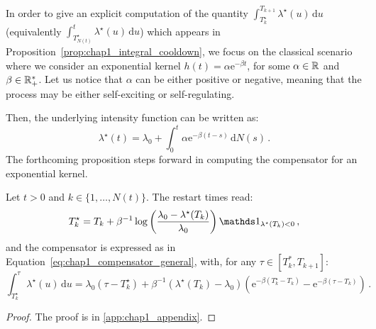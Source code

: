 In order to give an explicit computation of the quantity $\int_{T_{k}^\star}^{T_{k+1}}{\lambda^\star(u)\,\mathrm{d}u}$ (equivalently $\int_{T_{N(t)}^\star}^{t}{\lambda^\star(u)\,\mathrm{d}u}$) which appears in Proposition~\ref{prop:chap1_integral_cooldown}, we focus on the classical scenario where we consider an exponential kernel $h(t) = \alpha \mathrm{e}^{-\beta t}$, for some $\alpha\in{\mathbb R}$ and $\beta\in{\mathbb R}_+^*$.
Let us notice that $\alpha$ can be either positive or negative, meaning that the process may be either self-exciting or self-regulating.

Then, the underlying intensity function can be written as:
\begin{equation}\label{eq:chap1_exponential_intensity}
    \lambda^\star(t) = \lambda_0 + \int_{0}^{t}{\alpha \mathrm{e}^{-\beta(t-s)}\,\mathrm{d}N(s)}\,.
\end{equation}
The forthcoming proposition steps forward in computing the compensator for an exponential kernel.

\begin{proposition}
Let $t > 0$ and $k \in \{1, \dots, N(t)\}$.
The restart times read:
\[
    T_k^\star = T_k + \beta^{-1} \log \left({\frac{\lambda_0 - \lambda^\star(T_k)}{\lambda_0}} \right) \II_{\lambda^\star(T_k) < 0}\,,
\]
and the compensator is expressed as in Equation~\eqref{eq:chap1_compensator_general}, with,
for any $\tau \in [T_{k}^*, T_{k+1}]$:
\[
    \int_{T_{k}^\star}^{\tau}{\lambda^\star(u)\,\mathrm{d}u}
    = \lambda_0(\tau - T_{k}^\star) + \beta^{-1} (\lambda^\star(T_{k}) - \lambda_0) (\mathrm{e}^{-\beta(T_{k}^\star-T_{k})}-\mathrm{e}^{-\beta(\tau-T_{k})})\,.
\]

\label{prop:chap1_exp}
\end{proposition}
\begin{proof}
The proof is in \ref{app:chap1_appendix}.
\end{proof}

